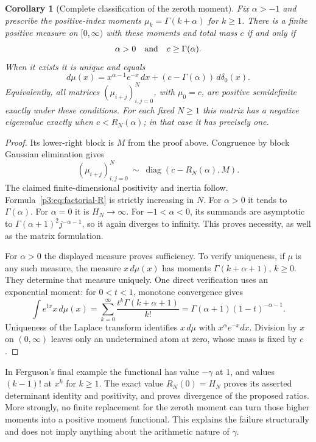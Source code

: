 \documentclass[11pt,a4paper]{article}
\newtheorem{corollary}[theorem]{Corollary}
\theoremstyle{definition}
\theoremstyle{remark}
\numberwithin{equation}{section}
\begin{document}
\begin{corollary}[Complete classification of the zeroth moment]
\label{p3:cor:factorial-completion}
Fix $\alpha>-1$ and prescribe the positive-index moments
$\mu_k=\Gamma(k+\alpha)$ for $k\ge1$. There is a finite positive
measure on $[0,\infty)$ with these moments and total mass $c$ if and
only if
\[
 \alpha>0\quad\hbox{and}\quad c\ge\Gamma(\alpha).
\]
When it exists it is unique and equals
\[
 d\mu(x)=x^{\alpha-1}e^{-x}\,dx+
                (c-\Gamma(\alpha))\,d\delta_0(x).
\]
Equivalently, all matrices $(\mu_{i+j})_{i,j=0}^{N}$, with
$\mu_0=c$, are positive semidefinite exactly under these conditions.
For each fixed $N\ge1$ this matrix has a negative eigenvalue exactly
when $c<R_N(\alpha)$; in that case it has precisely one.
\end{corollary}

\begin{proof}
Its lower-right block is $M$ from the proof above. Congruence by block
Gaussian elimination gives
\[
 (\mu_{i+j})_{i,j=0}^{N}\ \sim\
 \operatorname{diag}(c-R_N(\alpha),M).
\]
The claimed finite-dimensional positivity and inertia follow.
Formula~\eqref{p3:eq:factorial-R} is strictly increasing in $N$.
For $\alpha>0$ it tends to $\Gamma(\alpha)$. For $\alpha=0$ it is
$H_N\to\infty$. For $-1<\alpha<0$, its summands are asymptotic to
$\Gamma(\alpha+1)^2j^{-\alpha-1}$, so it again diverges to infinity.
This proves necessity, as well as the matrix formulation.

For $\alpha>0$ the displayed measure proves sufficiency. To verify
uniqueness, if $\mu$ is any such measure, the measure $x\,d\mu(x)$
has moments $\Gamma(k+\alpha+1)$, $k\ge0$. They determine that
measure uniquely. One direct verification uses an exponential
moment: for $0<t<1$, monotone convergence gives
\[
 \int e^{tx}x\,d\mu(x)
 =\sum_{k=0}^\infty\frac{t^k\Gamma(k+\alpha+1)}{k!}
 =\Gamma(\alpha+1)(1-t)^{-\alpha-1}.
\]
Uniqueness of the Laplace transform identifies $x\,d\mu$ with
$x^\alpha e^{-x}dx$. Division by $x$ on $(0,\infty)$ leaves only
an undetermined atom at zero, whose mass is fixed by $c$.
\end{proof}

In Ferguson's final example the functional has value $-\gamma$ at
$1$, and values $(k-1)!$ at $x^k$ for $k\ge1$. The exact value
$R_N(0)=H_N$ proves its asserted determinant identity and positivity,
and proves divergence of the proposed ratios. More strongly, no
finite replacement for the zeroth moment can turn those higher
moments into a positive moment functional. This explains the failure
structurally and does not imply anything about the arithmetic nature
of $\gamma$.
\end{document}

